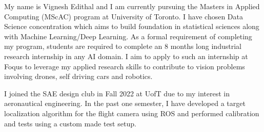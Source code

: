 \documentclass{resume}
\begin{document}
My name is Vignesh Edithal and I am currently pursuing the Masters in Applied Computing (MScAC) program at University of Toronto.
I have chosen Data Science concentration which aims to build foundation in statistical sciences along with Machine Learning/Deep Learning.
As a formal requirement of completing my program, students are required to complete an 8 months long industrial research internship in any AI domain.
I aim to apply to such an internship at Foqus to leverage my applied research skills to contribute to vision problems involving drones, self driving cars and robotics.

I joined the SAE design club in Fall 2022 at UofT due to my interest in aeronautical engineering.
In the past one semester, I have developed a target localization algorithm for the flight camera using ROS and performed calibration and tests using a custom made test setup.
\end{document}
